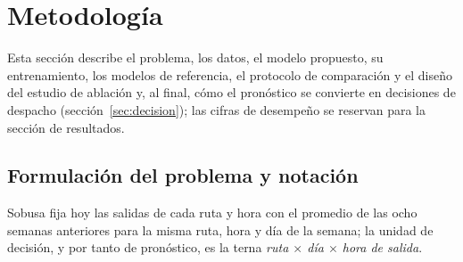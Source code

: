 \section{Metodología}
\label{sec:metodologia}

Esta sección describe el problema, los datos, el modelo propuesto, su entrenamiento, los modelos de
referencia, el protocolo de comparación y el diseño del estudio de ablación y, al final, cómo el pronóstico
se convierte en decisiones de despacho (sección~\ref{sec:decision}); las cifras de desempeño se
reservan para la sección de resultados.

\subsection{Formulación del problema y notación}
\label{sec:formulacion}

Sobusa fija hoy las salidas de cada ruta y hora con el promedio de las ocho semanas anteriores para la misma
ruta, hora y día de la semana; la unidad de decisión, y por tanto de pronóstico, es la terna
\emph{ruta $\times$ día $\times$ hora de salida}.

